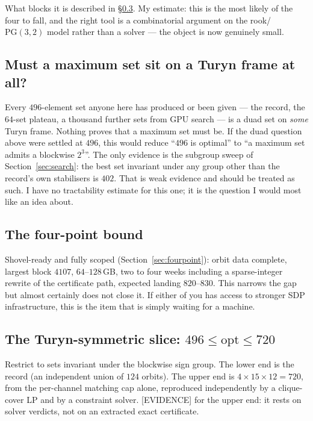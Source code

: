 \documentclass[10pt,a4paper]{article}
\newcommand{\EV}{\textsf{[EVIDENCE]}}
\begin{document}
What blocks it is described in \S\ref{sec:open-slice}. My estimate: this is the most likely of the
four to fall, and the right tool is a combinatorial argument on the rook/$\mathrm{PG}(3,2)$ model
rather than a solver --- the object is now genuinely small.

\subsection{Must a maximum set sit on a Turyn frame at all?}

Every $496$-element set anyone here has produced or been given --- the record, the $64$-set plateau,
a thousand further sets from GPU search --- is a duad set on \emph{some} Turyn frame. Nothing proves
that a maximum set must be. If the duad question above were settled at $496$, this would reduce
``$496$ is optimal'' to ``a maximum set admits a blockwise $2^3$''. The only evidence is the
subgroup sweep of Section~\ref{sec:search}: the best set invariant under any group other than the
record's own stabilisers is $402$. That is weak evidence and should be treated as such. I have no
tractability estimate for this one; it is the question I would most like an idea about.

\subsection{The four-point bound}

Shovel-ready and fully scoped (Section~\ref{sec:fourpoint}): orbit data complete, largest block
$4107$, $64$--$128$\,GB, two to four weeks including a sparse-integer rewrite of the certificate
path, expected landing $820$--$830$. This narrows the gap but almost certainly does not close it. If
either of you has access to stronger SDP infrastructure, this is the item that is simply waiting for
a machine.

\subsection{The Turyn-symmetric slice: $496 \le \mathrm{opt} \le 720$}\label{sec:open-slice}

Restrict to sets invariant under the blockwise sign group. The lower end is the record (an
independent union of $124$ orbits). The upper end is $4 \times 15 \times 12 = 720$, from the
per-channel matching cap alone, reproduced independently by a clique-cover LP and by a constraint
solver. \EV{} for the upper end: it rests on solver verdicts, not on an extracted exact certificate.
\end{document}
